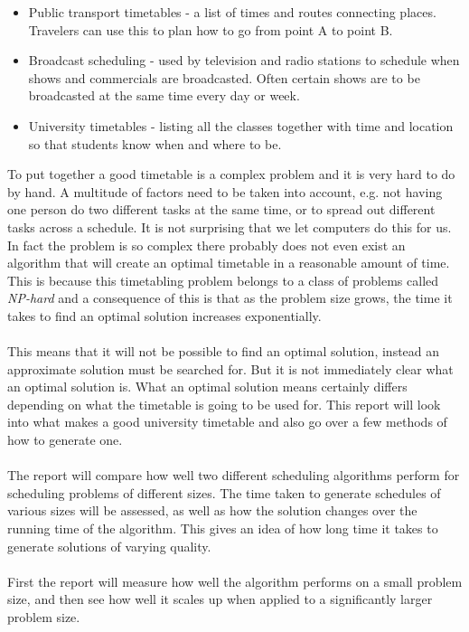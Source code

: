 \documentclass[titlepage,a4paper]{article}
\begin{document}
\begin{itemize}

  \item Public transport timetables - a list of times and routes connecting places. Travelers can use this to plan how to go from point A to point B.
  \item Broadcast scheduling - used by television and radio stations to schedule when shows and commercials are broadcasted. Often certain shows are to be broadcasted at the same time every day or week.
  \item University timetables - listing all the classes together with time and location so that students know when and where to be. 

\end{itemize}
To put together a good timetable is a complex problem and it is very hard to do by hand. A multitude of factors need to be taken into account, e.g. not having one person do two different tasks at the same time, or to spread out different tasks across a schedule. It is not surprising that we let computers do this for us. In fact the problem is so complex there probably does not even exist an algorithm that will create an optimal timetable in a reasonable amount of time. This is because this timetabling problem belongs to a class of problems called \emph{NP-hard}\cite{guidedSearch09}  and a consequence of this is that as the problem size grows, the time it takes to find an optimal solution increases exponentially. \\\\
This means that it will not be possible to find an optimal solution, instead an approximate solution must be searched for. But it is not immediately clear what an optimal solution is. What an optimal solution means certainly differs depending on what the timetable is going to be used for. This report will look into what makes a good university timetable and also go over a few methods of how to generate one. \\\\
The report will compare how well two different scheduling algorithms perform for scheduling problems of different sizes. The time taken to generate schedules of various sizes will be assessed, as well as how the solution changes over the running time of the algorithm. This gives an idea of how long time it takes to generate solutions of varying quality. \\\\
First the report will measure how well the algorithm performs on a small problem size, and then see how well it scales up when applied to a significantly larger problem size.
\end{document}
